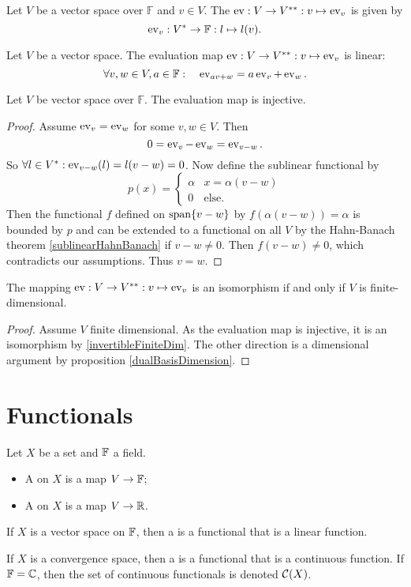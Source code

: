 \begin{definition}
Let $V$ be a vector space over $\mathbb{F}$ and $v\in V$. The  $\operatorname{ev}: V\to {V}^{**}: v\mapsto \operatorname{ev}_v$ is given by
\[ \operatorname{ev}_v: {V}^* \to \mathbb{F}: l\mapsto l(v). \]
\end{definition}

\begin{lemma}
Let $V$ be a vector space. The evaluation map $\operatorname{ev}: V\to {V}^{**}: v\mapsto \operatorname{ev}_v$ is linear:
\[ \forall v,w\in V, a\in\mathbb{F}: \quad \operatorname{ev}_{av + w} = a\operatorname{ev}_v + \operatorname{ev}_w. \]
\end{lemma}
\begin{lemma}
Let $V$ be vector space over $\mathbb{F}$. The evaluation map is injective.
\end{lemma}
\begin{proof}
Assume $\operatorname{ev}_v = \operatorname{ev}_w$ for some $v,w\in V$. Then
\[ 0 = \operatorname{ev}_v - \operatorname{ev}_w  = \operatorname{ev}_{v-w}. \]
So $\forall l\in {V}^*: \operatorname{ev}_{v-w}(l) = l(v-w) = 0$. Now define the sublinear functional by
\[ p(x) = \begin{cases}
\alpha & x = \alpha(v-w) \\
0 & \text{else}.
\end{cases} \]
Then the functional $f$ defined on $\operatorname{span}\{v-w\}$ by $f(\alpha(v-w)) = \alpha$ is bounded by $p$ and can be extended to a functional on all $V$ by the Hahn-Banach theorem \ref{sublinearHahnBanach} if $v-w\neq 0$. Then $f(v-w) \neq 0$, which contradicts our assumptions. Thus $v=w$.
\end{proof}

\begin{proposition}
The mapping $\operatorname{ev}: V\to {V}^{**}: v\mapsto \operatorname{ev}_v$ is an isomorphism \textup{if and only if} $V$ is finite-dimensional.
\end{proposition}
\begin{proof}
Assume $V$ finite dimensional. As the evaluation map is injective, it is an isomorphism by \ref{invertibleFiniteDim}.
The other direction is a dimensional argument by proposition \ref{dualBasisDimension}.
\end{proof}




\chapter{Functionals}
\begin{definition}
Let $X$ be a set and $\mathbb{F}$ a field.
\begin{itemize}
\item A  on $X$ is a map $V\to \mathbb{F}$;
\item A  on $X$ is a map $V\to \mathbb{R}$.
\end{itemize}
If $X$ is a vector space on $\mathbb{F}$, then a  is a functional that is a linear function.

If $X$ is a convergence space, then a  is a functional that is a continuous function.
If $\mathbb{F} = \mathbb{C}$, then the set of continuous functionals is denoted $\operatorname{\mathcal{C}}(X)$.
\end{definition}

